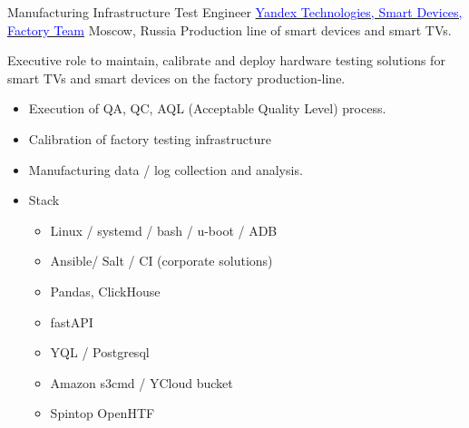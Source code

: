         { Manufacturing Infrastructure Test Engineer}
        {\href{https://www.yandex.com/alice}{\textcolor{blue}{Yandex Technologies, Smart Devices, Factory Team}}}
        {Moscow, Russia}
        {
        \newline
        Production line of smart devices and smart TVs.
        }
        { Executive role to maintain, calibrate and deploy hardware testing solutions for smart TVs and smart devices on the factory production-line.
            \begin{itemize}
                \item Execution of QA, QC, AQL (Acceptable Quality Level) process.
                \item Calibration of factory testing infrastructure
                \item Manufacturing data / log  collection and analysis.
                \item Stack
                    \begin{itemize}
                        \item Linux / systemd / bash / u-boot / ADB 
                        \item Ansible/ Salt / CI (corporate solutions)
                        \item Pandas, ClickHouse
                        \item fastAPI
                        \item YQL / Postgresql
                        \item Amazon s3cmd / YCloud bucket
                        \item Spintop OpenHTF
                    \end{itemize}
            \end{itemize}
        }
        

